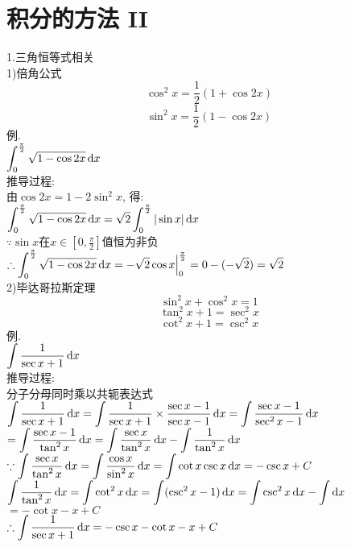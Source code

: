 \chapter{积分的方法 II}
1.三角恒等式相关\\
1)倍角公式\\
\[\cos^2x=\frac{1}{2}(1+\cos2x)\]
\[\sin^2x=\frac{1}{2}(1-\cos2x)\]
例.\\
\phantom{例}$\displaystyle\int_0^{\frac{\pi}{2}}\sqrt{1-\cos2x}\mathop{}\!\mathrm{d} x$\\
推导过程:\\
由$\cos2x=1-2\sin^2x$, 得:\\
$\displaystyle\int_0^{\frac{\pi}{2}}\sqrt{1-\cos2x}\mathop{}\!\mathrm{d} x=\sqrt{2}\int_0^{\frac{\pi}{2}}|\sin x|\mathop{}\!\mathrm{d} x$\\
$\because\sin x$在$x\in[0,\frac{\pi}{2}]$值恒为非负\\
$\therefore\displaystyle\int_0^{\frac{\pi}{2}}\sqrt{1-\cos2x}\mathop{}\!\mathrm{d} x=-\sqrt{2}\cos x\Big{|}_0^{\frac{\pi}{2}}=0-(-\sqrt{2})=\sqrt{2}$\\

2)毕达哥拉斯定理\\
\[\sin^2x+\cos^2x=1\]
\[\tan^2x+1=\sec^2x\]
\[\cot^2x+1=\csc^2x\]
例.\\
\phantom{例}$\displaystyle\int\frac{1}{\sec x+1}\mathop{}\!\mathrm{d} x$\\
推导过程:\\
分子分母同时乘以共轭表达式\\
$\displaystyle\int\frac{1}{\sec x+1}\mathop{}\!\mathrm{d} x=\int\frac{1}{\sec x+1}\times\frac{\sec x-1}{\sec x-1}\mathop{}\!\mathrm{d} x=\int\frac{\sec x-1}{\sec^2x-1}\mathop{}\!\mathrm{d} x$\\
$\displaystyle=\int\frac{\sec x-1}{\tan^2x}\mathop{}\!\mathrm{d} x=\int\frac{\sec x}{\tan^2x}\mathop{}\!\mathrm{d} x-\int\frac{1}{\tan^2x}\mathop{}\!\mathrm{d} x$\\
$\displaystyle\because\int\frac{\sec x}{\tan^2x}\mathop{}\!\mathrm{d} x=\int\frac{\cos x}{\sin^2x}\mathop{}\!\mathrm{d} x=\int\cot x\csc x\mathop{}\!\mathrm{d} x=-\csc x+C$\\
\phantom{$\because$}$\displaystyle\int\frac{1}{\tan^2x}\mathop{}\!\mathrm{d} x=\int\cot^2x\mathop{}\!\mathrm{d} x=\int(\csc^2x-1)\mathop{}\!\mathrm{d} x=\int\csc^2x\mathop{}\!\mathrm{d} x-\int\mathop{}\!\mathrm{d} x$\\
$=-\cot x-x+C$\\
$\displaystyle\therefore\int\frac{1}{\sec x+1}\mathop{}\!\mathrm{d} x=-\csc x-\cot x-x+C$\\


